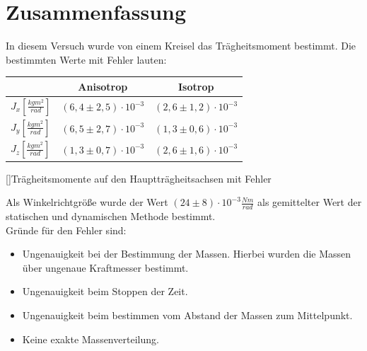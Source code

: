 \documentclass[12pt,a4paper,]{scrreprt}
\begin{document}
	\chapter{Zusammenfassung}
    	In diesem Versuch wurde von einem Kreisel das Trägheitsmoment bestimmt. Die bestimmten Werte mit Fehler lauten: \\
        \begin{center}
        
   	\begin{tabular}{l|c|c}
			&	Anisotrop  & Isotrop    \\ \hline \hline
		$J_x [\frac{kgm^2}{rad}]$ & $(6,4 \pm 2,5) \cdot 10^{-3}$& $(2,6 \pm 1,2) \cdot 10^{-3}$ \\
		$J_y [\frac{kgm^2}{rad}]$ & $(6,5 \pm 2,7) \cdot 10^{-3}$ & $(1,3 \pm 0,6) \cdot 10^{-3}$ \\
		$J_z [\frac{kgm^2}{rad}]$ & $(1,3 \pm 0,7) \cdot 10^{-3}$ & $(2,6 \pm 1,6) \cdot 10^{-3}$
	\end{tabular}
    	[]{Trägheitsmomente auf den Hauptträgheitsachsen mit Fehler}
    
        \end{center}
      	Als Winkelrichtgröße wurde der Wert	$(24 \pm 8) \cdot 10^{-3} \frac{Nm}{rad}$
        als gemittelter Wert der statischen und dynamischen Methode bestimmt. \\
     	Gründe für den Fehler sind:
     	\begin{itemize}
       		\item Ungenauigkeit bei der Bestimmung der Massen. Hierbei wurden die Massen über ungenaue Kraftmesser bestimmt.
        	\item Ungenauigkeit beim Stoppen der Zeit.
        	\item Ungenauigkeit beim bestimmen vom Abstand der Massen zum Mittelpunkt.
        	\item Keine exakte Massenverteilung.
      	\end{itemize}
	\pagebreak

\end{document}
